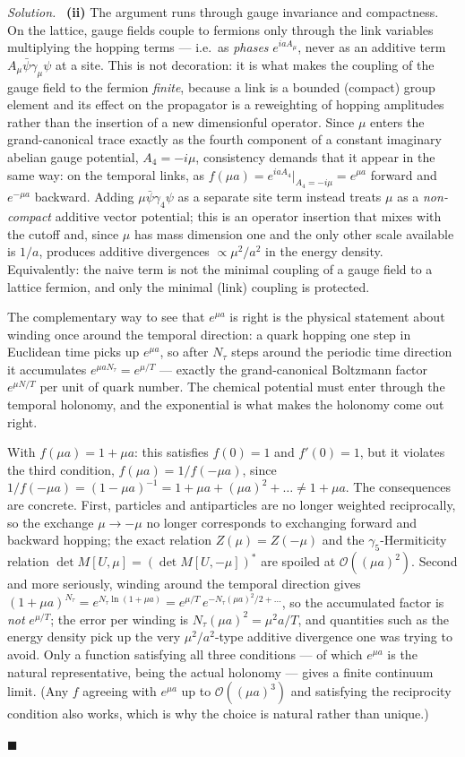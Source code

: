 \documentclass[11pt]{article}
\newenvironment{solution}{\par\smallskip\noindent\textit{Solution.}\ }{\hfill$\blacksquare$\par\smallskip}
\begin{document}
\begin{solution}
\textbf{(ii)} The argument runs through gauge invariance and compactness. On the lattice, gauge fields couple to fermions only through the link variables multiplying the hopping terms --- i.e.\ as \emph{phases} $e^{iaA_\mu}$, never as an additive term $A_\mu\bar\psi\gamma_\mu\psi$ at a site. This is not decoration: it is what makes the coupling of the gauge field to the fermion \emph{finite}, because a link is a bounded (compact) group element and its effect on the propagator is a reweighting of hopping amplitudes rather than the insertion of a new dimensionful operator. Since $\mu$ enters the grand-canonical trace exactly as the fourth component of a constant imaginary abelian gauge potential, $A_4 = -i\mu$, consistency demands that it appear in the same way: on the temporal links, as $f(\mu a) = e^{iaA_4}|_{A_4 = -i\mu} = e^{\mu a}$ forward and $e^{-\mu a}$ backward. Adding $\mu\bar\psi\gamma_4\psi$ as a separate site term instead treats $\mu$ as a \emph{non-compact} additive vector potential; this is an operator insertion that mixes with the cutoff and, since $\mu$ has mass dimension one and the only other scale available is $1/a$, produces additive divergences $\propto \mu^2/a^2$ in the energy density. Equivalently: the naive term is not the minimal coupling of a gauge field to a lattice fermion, and only the minimal (link) coupling is protected.

The complementary way to see that $e^{\mu a}$ is right is the physical statement about winding once around the temporal direction: a quark hopping one step in Euclidean time picks up $e^{\mu a}$, so after $N_\tau$ steps around the periodic time direction it accumulates $e^{\mu a N_\tau} = e^{\mu/T}$ --- exactly the grand-canonical Boltzmann factor $e^{\mu N/T}$ per unit of quark number. The chemical potential must enter through the temporal holonomy, and the exponential is what makes the holonomy come out right.

With $f(\mu a) = 1 + \mu a$: this satisfies $f(0)=1$ and $f'(0)=1$, but it violates the third condition, $f(\mu a) = 1/f(-\mu a)$, since $1/f(-\mu a) = (1-\mu a)^{-1} = 1 + \mu a + (\mu a)^2 + \dots \neq 1 + \mu a$. The consequences are concrete. First, particles and antiparticles are no longer weighted reciprocally, so the exchange $\mu \to -\mu$ no longer corresponds to exchanging forward and backward hopping; the exact relation $Z(\mu) = Z(-\mu)$ and the $\gamma_5$-Hermiticity relation $\det M[U,\mu] = (\det M[U,-\mu])^*$ are spoiled at $\mathcal{O}((\mu a)^2)$. Second and more seriously, winding around the temporal direction gives $(1+\mu a)^{N_\tau} = e^{N_\tau \ln(1+\mu a)} = e^{\mu/T}\,e^{-N_\tau(\mu a)^2/2 + \dots}$, so the accumulated factor is \emph{not} $e^{\mu/T}$; the error per winding is $N_\tau (\mu a)^2 = \mu^2 a/T$, and quantities such as the energy density pick up the very $\mu^2/a^2$-type additive divergence one was trying to avoid. Only a function satisfying all three conditions --- of which $e^{\mu a}$ is the natural representative, being the actual holonomy --- gives a finite continuum limit. (Any $f$ agreeing with $e^{\mu a}$ up to $\mathcal{O}((\mu a)^3)$ and satisfying the reciprocity condition also works, which is why the choice is natural rather than unique.)


\end{solution}
\end{document}

